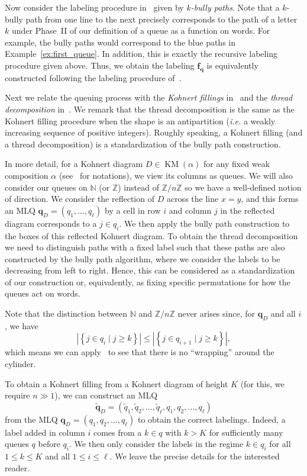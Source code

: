 \documentclass[reqno]{amsart}
\newcommand{\0}{\phantom{c}}
\DeclareMathOperator{\KM}{KM}
\newcommand{\ff}{\mathbf{f}}
\newcommand{\qq}{\mathbf{q}}
\newcommand{\NN}{\mathbb{N}}
\newcommand{\ZZ}{\mathbb{Z}}
\newcommand{\set}[1]{\left\{ #1 \right\}}
\newcommand{\abs}[1]{\left| #1 \right|}
\newcommand{\defn}[1]{{\color{darkred}\emph{#1}}} %
\theoremstyle{plain}
\theoremstyle{definition}
\numberwithin{equation}{section}
\newcommand{\Darij}[1]{\todo[size=\tiny,inline,color=red!30]{#1
      \\ \hfill --- Darij}}
\begin{document}
Now consider the labeling procedure in~\cite[\S 2.2]{AasLin17} given by \defn{$k$-bully paths}.
Note that a $k$-bully path from one line to the next precisely corresponds to the path of a letter $k$ under Phase~II of our definition of a queue as a function on words.
For example, the bully paths would correspond to the blue paths in Example~\ref{ex:first_queue}.
In addition, this is exactly the recursive labeling procedure given above.
Thus, we obtain the labeling $\ff_{\qq}$ is equivalently constructed following the labeling procedure of~\cite{AasLin17}.

\Darij{TODO: Connect this with parking functions?}

Next we relate the queuing process with the \defn{Kohnert fillings} in~\cite[Def.~2.5]{AssSea18} and the \defn{thread decomposition} in~\cite[Def.~3.5]{AssSea18}.
We remark that the thread decomposition is the same as the Kohnert filling procedure when the shape is an antipartition (\textit{i.e.} a weakly increasing sequence of positive integers).
Roughly speaking, a Kohnert filling (and a thread decomposition) is a standardization of the bully path construction.

In more detail, for a Kohnert diagram $D \in \KM(\alpha)$ for any fixed weak composition $\alpha$ (see~\cite{AssSea18} for notations), we view its columns as queues.
We will also consider our queues on $\NN$ (or $\ZZ$) instead of $\ZZ/n\ZZ$ so we have a well-defined notion of direction.
We consider the reflection of $D$ across the line $x = y$, and this forms an MLQ $\qq_D = (q_1, \dotsc, q_{\ell})$ by a cell in row $i$  and column $j$ in the reflected diagram corresponds to a $j \in q_i$.
We then apply the bully path construction to the boxes of this reflected Kohnert diagram.
To obtain the thread decomposition we need to distinguish paths with a fixed label such that these paths are also constructed by the bully path algorithm, where we consider the labels to be decreasing from left to right.
Hence, this can be considered as a standardization of our construction or, equivalently, as fixing specific permutations for how the queues act on words.

Note that the distinction between $\NN$ and $\ZZ/n\ZZ$ never arises since, for $\qq_D$ and all $i$, we have
\[
\abs{\set{ j \in q_i \mid j \geq k }} \leq \abs{\set{  j \in q_{i+1} \mid j \geq k }},
\]
which means we can apply~\cite[Lemma~2.2]{AssSea18} to see that there is no ``wrapping'' around the cylinder.

To obtain a Kohnert filling from a Kohnert diagram of height $K$ (for this, we require $n \gg 1$), we can construct an MLQ
\[
\widetilde{\qq}_D = (\widetilde{q}_1, \widetilde{q}_2, \dotsc, \widetilde{q}_{\widetilde{\ell}}, q_1, q_2, \dotsc, q_{\ell})
\]
from the MLQ $\qq_D = (q_1, q_2, \dotsc, q_{\ell})$ to obtain the correct labelings.
Indeed, a label added in column $i$ comes from a $k \in q$ with $k > K$ for sufficiently many queues $q$ before $q_i$.
We then only consider the labels in the regime $k \in q_i$ for all $1 \leq k \leq K$ and all $1 \leq i \leq \ell$.
We leave the precise details for the interested reader.
\end{document}
